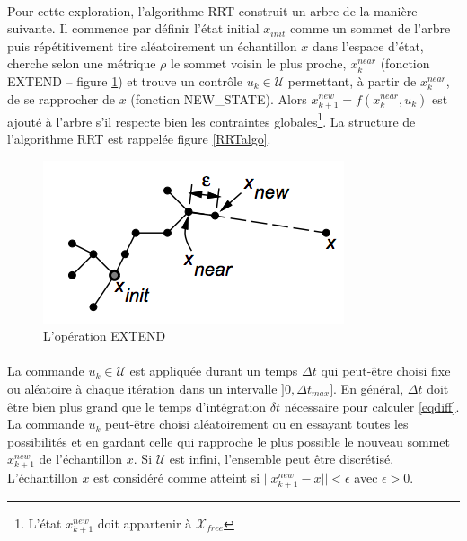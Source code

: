 \documentclass[12pt]{article}
\begin{document}
\paragraph{}
Pour cette exploration, l'algorithme RRT construit un arbre de la manière suivante. Il commence par définir l'état initial $x_{init}$ comme un sommet de l'arbre puis répétitivement tire aléatoirement un échantillon $x$ dans l'espace d'état, cherche selon une métrique $\rho$ le sommet voisin le plus proche, $x^{near}_k$ (fonction EXTEND -- figure \ref{EXTEND}) et trouve un contrôle $u_k \in \mathcal{U}$ permettant, à partir de $x^{near}_k$, de se rapprocher de $x$ (fonction NEW\_STATE). Alors $x^{new}_{k+1} = f(x^{near}_k,u_k)$ est ajouté à l'arbre s'il respecte bien les contraintes globales\footnote{L'état $x^{new}_{k+1}$ doit appartenir à $\mathcal{X}_{free}$}. La structure de l'algorithme RRT est rappelée figure \ref{RRTalgo}.

\begin{figure}[H]
\centering
\includegraphics[scale=0.7]{img/EXTEND.png}
\caption{L'opération EXTEND}
\label{EXTEND}
\end{figure}

\paragraph{}
La commande $u_k \in \mathcal{U}$ est appliquée durant un temps $\Delta t$ qui peut-être choisi fixe ou aléatoire à chaque itération dans un intervalle $]0,\Delta t_{max}]$. En général, $\Delta t$ doit être bien plus grand que le temps d'intégration $\delta t$ nécessaire pour calculer \eqref{eqdiff}. La commande $u_k$ peut-être choisi aléatoirement ou en essayant toutes les possibilités et en gardant celle qui rapproche le plus possible le nouveau sommet $x^{new}_{k+1}$ de l'échantillon $x$. Si $\mathcal{U}$ est infini, l'ensemble peut être discrétisé. L'échantillon $x$ est considéré comme atteint si $||x^{new}_{k+1}-x||<\epsilon$ avec $\epsilon>0$.
\end{document}
